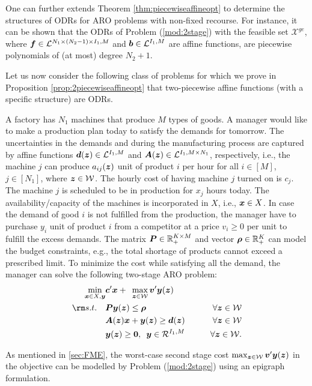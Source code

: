 \documentclass[fleqn,mnsc,blindrev]{informs4}
\newcommand{\mb}[1]{\mbox{\boldmath \ensuremath{#1}}}
\begin{document}
\iffalse

 {  One can further extends Theorem \ref{thm:piecewiseaffineopt} to determine the structures of ODRs for ARO problems with non-fixed recourse.  For instance, it can be shown that the ODRs of Problem (\ref{mod:2stage}) with the feasible set $\mathcal{X}^{ge}$, where $\mb{f} \in \mathcal{L}^{N_1 \times (N_2-1) \times I_1, M}$ and  $\mb{b} \in \mathcal{L}^{I_1,M}$ are affine functions, are piecewise polynomials of (at most) degree $N_2+1$. } 


Let us now consider the following class of problems for which we prove in Proposition \ref{prop:2piecewiseaffineopt} that two-piecewise affine functions (with a specific structure) are ODRs.

	\begin{example} 
		A factory has $N_1$ machines that produce $M$ types of goods. A manager would like to make a production plan today to satisfy the demands for tomorrow. The uncertainties in the demands and during the manufacturing process are captured by affine functions $\mb{d}(\mb{z}) \in \mathcal{L}^{I_1,M}$ and $\mb{A}(\mb{z}) \in \mathcal{L}^{I_1, M\times N_1}$, respectively, i.e., the machine $j$ can produce $a_{ij}(\mb{z})$ unit of product $i$ per hour for all $i\in [M]$, $j\in [N_1]$, where $\mb{z} \in \mathcal{W}$. The hourly cost of having machine $j$ turned on is $c_j$. The machine $j$ is scheduled to be in production for $x_j$ hours today. The availability/capacity of the machines is incorporated in $X$, i.e., $\mb{x}\in X$.  In case the demand of good $i$ is not fulfilled from the production, the manager have to purchase $y_i$ unit of product $i$ from a competitor at a price $v_{i} \ge 0$ per unit to fulfill the excess demands. The  matrix $\mb{P} \in \mathbb{R}^{K\times M}_+$ and  vector $\mb{\rho}\in \mathbb{R}^{K}_+$ can model the budget constraints, e.g., the total shortage of products cannot exceed a prescribed limit. To minimize the cost while satisfying all the demand, the manager can solve the following two-stage ARO problem:
\begin{equation}\label{p:production}
			\begin{aligned} 
				\min_{ \boldsymbol{x} \in X,  \boldsymbol{y}}  &  \mb{c}'\mb{x} +  \enskip \max_{ \boldsymbol{z} \in \mathcal{W}} \mb{v}'\mb{y}(\mb{z}) \\
				{\rm s.t.} \quad  &   \mb{P}\mb{y}(\mb{z}) \le \mb{\rho} \qquad & \forall \mb{z} \in \mathcal{W} \\
				& \mb{A}(\mb{z})\mb{x} + \mb{y}(\mb{z}) \ge \mb{d}(\mb{z}) \qquad & \forall \mb{z} \in \mathcal{W} \\
				& \mb{y}(\mb{z}) \ge \mb{0}, \,\,\,  \mb{y} \in \mathcal{R}^{I_1,M} & \forall \mb{z} \in \mathcal{W}. 
			\end{aligned}
\end{equation}
		 \hfill \Halmos
		
        As mentioned in \textsection \ref{sec:FME}, the worst-case second stage cost $ \max_{ \boldsymbol{z} \in \mathcal{W} } \mb{v}'\mb{y}(\mb{z})$ in the objective can be modelled by Problem (\ref{mod:2stage}) using an epigraph formulation. 
	\end{example} 
	
\end{document}
